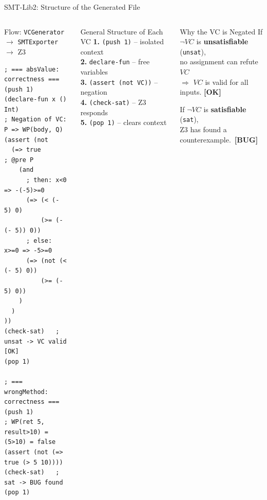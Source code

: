 \documentclass[aspectratio=169,11pt]{beamer}
\newcommand{\ok}{\textcolor{accent}{\textbf{[OK]}}}
\newcommand{\bug}{\textcolor{warn}{\textbf{[BUG]}}}
\begin{document}
\begin{frame}[fragile]{SMT-Lib2: Structure of the Generated File}

\begin{columns}[t]
  \begin{block}{Flow: \texttt{VCGenerator} $\to$ \texttt{SMTExporter} $\to$ Z3}
\begin{lstlisting}[style=smtslide,basicstyle=\ttfamily\scriptsize]
; === absValue: correctness ===
(push 1)
(declare-fun x () Int)
; Negation of VC: P => WP(body, Q)
(assert (not
  (=> true          ; @pre P
    (and
      ; then: x<0 => -(-5)>=0
      (=> (< (- 5) 0)
          (>= (- (- 5)) 0))
      ; else: x>=0 => -5>=0
      (=> (not (< (- 5) 0))
          (>= (- 5) 0))
    )
  )
))
(check-sat)   ; unsat -> VC valid [OK]
(pop 1)

; === wrongMethod: correctness ===
(push 1)
; WP(ret 5, result>10) = (5>10) = false
(assert (not (=> true (> 5 10))))
(check-sat)   ; sat -> BUG found
(pop 1)
\end{lstlisting}
  \end{block}

  \begin{exampleblock}{General Structure of Each VC}
    \medskip
    \textbf{1.} \texttt{(push 1)} -- isolated context\\[4pt]
    \textbf{2.} \texttt{declare-fun} -- free variables\\[4pt]
    \textbf{3.} \texttt{(assert (not VC))} -- negation\\[4pt]
    \textbf{4.} \texttt{(check-sat)} -- Z3 responds\\[4pt]
    \textbf{5.} \texttt{(pop 1)} -- clears context
    \medskip
  \end{exampleblock}
  \begin{block}{Why the VC is Negated}
    \medskip
    \small
    If $\neg\mathit{VC}$ is \textbf{unsatisfiable} (\texttt{unsat}),\\
    no assignment can refute $\mathit{VC}$\\
    $\Rightarrow$ $\mathit{VC}$ is valid for all inputs. \ok

    \medskip
    If $\neg\mathit{VC}$ is \textbf{satisfiable} (\texttt{sat}),\\
    Z3 has found a counterexample.\ \bug
    \medskip
  \end{block}
\end{columns}
\end{frame}
\end{document}
